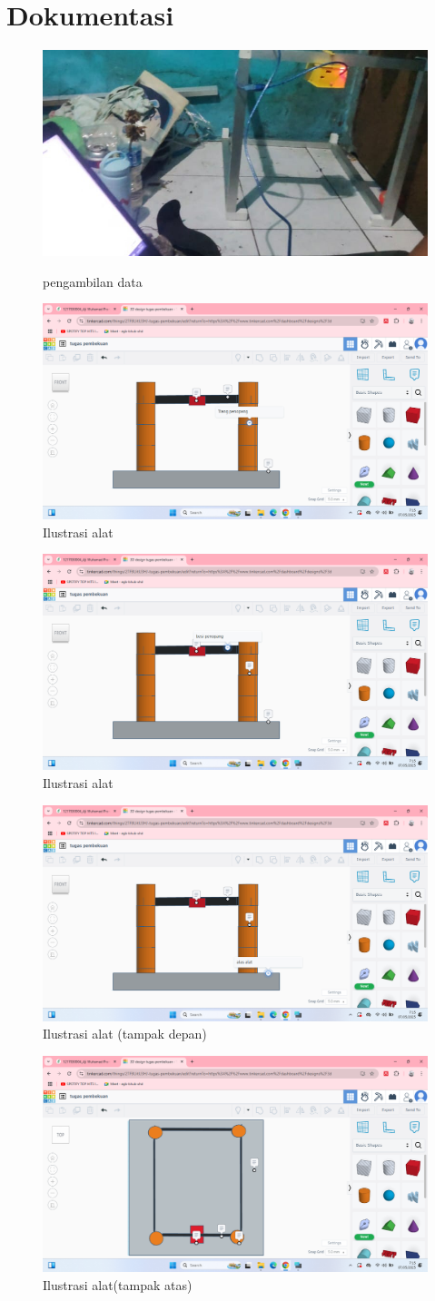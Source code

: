 \section{Dokumentasi}
\begin{figure}[!htbp]
    \centering
    \includegraphics[width=0.5\linewidth]{images/Proses-Akuisisi-Data.jpeg}
    \caption{pengambilan data}
    \citep{ajitot2024koefisien}
    \label{fig:pengambilan-data}
\end{figure}
\begin{figure}[!htbp]
    \centering
    \includegraphics[width=0.5\linewidth]{images/Screenshot (2).png}
    \caption{Ilustrasi alat}
    \label{fig:ilustrasi-alat-1}
\end{figure}
\begin{figure}[!htbp]
    \centering
    \includegraphics[width=0.5\linewidth]{images/Screenshot (3).png}
    \caption{Ilustrasi alat}
    \label{fig:ilustrasi-alat-2}
\end{figure}
\begin{figure}[!htbp]
    \centering
    \includegraphics[width=0.5\linewidth]{images/Screenshot (4).png}
    \caption{Ilustrasi alat (tampak depan)}
    \label{fig:ilustrasi-alat-depan}
\end{figure}
\begin{figure}[!htbp]
    \centering
    \includegraphics[width=0.5\linewidth]{images/Screenshot (5).png}
    \caption{Ilustrasi alat(tampak atas)}
    \label{fig:ilustrasi-alat-atas}
\end{figure}

